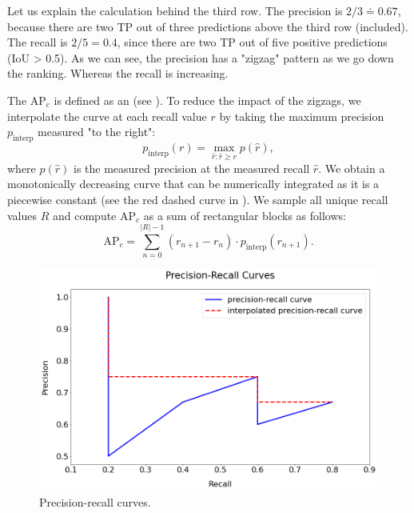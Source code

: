 Let us explain the calculation behind the third row. The precision is
$2/3 \doteq 0.67$, because there are two TP out of three predictions above the third
row (included). The recall is $2/5 = 0.4$, since there are two TP out of
five positive predictions (IoU > 0.5). As we can see, the precision has a "zigzag"
pattern as we go down the ranking. Whereas the recall is increasing.

The AP$_c$ is defined as an  (see
). To reduce the impact of the zigzags, we
interpolate the curve at each recall value $r$ by taking the maximum precision
$p_\text{interp}$ measured "to the right":
$$
    p_\text{interp}(r) = \max\limits_{\hat{r}:\hat{r} \geq r} p(\hat{r}),
$$
where $p(\hat{r})$ is the measured precision at the measured recall $\hat{r}$.
We obtain a monotonically decreasing curve that can be numerically integrated as
it is a piecewise constant (see the red dashed curve in ). We sample all unique recall values $R$ and compute
AP$_c$ as a sum of rectangular blocks as follows:
$$
    \text{AP}_c = \sum\limits^{\lvert R\rvert - 1}_{n = 0} (r_{n+1} - r_n)
    \cdot p_\text{interp}(r_{n+1}).
$$

\begin{figure}[H]
    \centering
    \includegraphics[width=0.8\linewidth]{Sources/Figures/precisionrecall.png}
    \caption{Precision-recall curves.}
    \label{fig:precisionrecall}
\end{figure}

